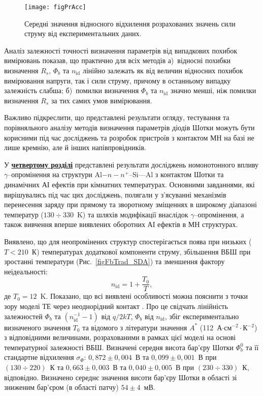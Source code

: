 \documentclass[a5paper,10pt,twoside,openany,article]{memoir} %
\begin{document}
\begin{figure}
\center
\texttt{[image: figPrAcc]}%
\caption{\label{figPrAcc}
Середні значення відносного відхилення розрахованих значень сили струму від експериментальних даних.
}
\end{figure}


Аналіз залежності точності визначення параметрів від випадкових похибок вимірювань показав, що практично для всіх методів
а)~відносні похибки визначення $R_s$, $\Phi_b$ та $n_\mathrm{id}$ лінійно залежать як від величин відносних похибок вимірювання напруги, так і сили струму, причому в останньому випадку залежність слабша;
б)~помилки визначення $\Phi_b$ та $n_\mathrm{id}$ значно менші, ніж помилки визначення $R_s$ за тих самих умов вимірювання.

Важливо підкреслити, що представлені результати огляду, тестування та порівняльного аналізу методів визначення параметрів діодів Шотки можуть бути корисними під час досліджень та розробок пристроїв з контактом МН на базі не лише кремнію, але й інших напівпровідників.


У  \underline{\textbf{четвертому розділі}} представлені результати досліджень
номонотонного впливу $\gamma$--опромінення на структури Al$-n-n^+$--Si---Al з контактом Шотки та
динамічних АІ ефектів при кімнатних температурах.
Основними завданнями, які вирішувались під час цих досліджень, полягали у з'ясуванні механізмів перенесення заряду при прямому та
    зворотному зміщеннях в широкому діапазоні температур ($130\div330$~K) та шляхів модифікації внаслідок $\gamma$--опромінення, а також вивчення вперше виявлених
    оборотних АІ ефектів в МН структурах.

Виявлено, що для неопромінених структур спостерігається поява при низьких ($T<210$~К) температурах додаткової компоненти струму,
збільшення ВБШ при зростанні температури (Рис.~\ref{figFbTrad_SDA}) та зменшення фактору неідеальності:
\begin{equation}\label{eqN_T:TE}
n_{\mathrm{id}}=1+\frac{T_0}{T},
\end{equation}
де $T_0=12$~K.
Показано, що всі виявлені особливості можна пояснити з точки зору моделі ТЕ через неоднорідний контакт \cite{Tung:MSE}.
Про це свідчать лінійність залежностей $\Phi_{b}$ та $(n_{\mathrm{id}}^{-1}-1)$ від $q/2kT$, $\Phi_{b}$ від $n_{\mathrm{id}}$,
збіг експериментально визначеного значення $T_0$  та відомого з літератури значення $A^*$ (112~А$\cdot$см$^{-2}\cdot$К$^{-2}$) з відповідними величинами,
розрахованими в рамках цієї моделі на основі температурної залежності ВБШ.
       Визначені середня висота бар'єру Шотки $\Phi_b^0$ та її стандартне відхилення $\sigma_{\Phi}$:
       $0,872\pm0,004$~В та $0,099\pm0,001$~В при $(130\div220)$~К та
       $0,663\pm0,003$~В та $0,040\pm0,005$~В при $(230\div330)$~К, відповідно.
Визначено середнє значення висоти бар'єру Шотки в області зі зниженим бар'єром (в області патчу) $54\pm4$~мВ.
\end{document}
